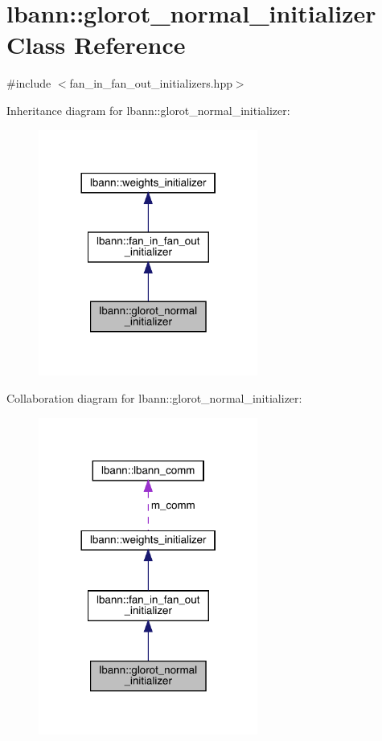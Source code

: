 \hypertarget{classlbann_1_1glorot__normal__initializer}{}\section{lbann\+:\+:glorot\+\_\+normal\+\_\+initializer Class Reference}
\label{classlbann_1_1glorot__normal__initializer}


{\ttfamily \#include $<$fan\+\_\+in\+\_\+fan\+\_\+out\+\_\+initializers.\+hpp$>$}



Inheritance diagram for lbann\+:\+:glorot\+\_\+normal\+\_\+initializer\+:\nopagebreak
\begin{figure}[H]
\begin{center}
\leavevmode
\includegraphics[width=204pt]{classlbann_1_1glorot__normal__initializer__inherit__graph}
\end{center}
\end{figure}


Collaboration diagram for lbann\+:\+:glorot\+\_\+normal\+\_\+initializer\+:\nopagebreak
\begin{figure}[H]
\begin{center}
\leavevmode
\includegraphics[width=204pt]{classlbann_1_1glorot__normal__initializer__coll__graph}
\end{center}
\end{figure}
